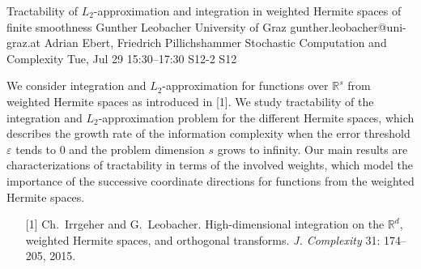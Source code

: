 \begin{talk}
  {Tractability of $L_2$-approximation and integration in weighted Hermite spaces of finite smoothness}%
  {Gunther Leobacher}%
  {University of Graz}%
  {gunther.leobacher@uni-graz.at}%
  {Adrian Ebert, Friedrich Pillichshammer}%
  {Stochastic Computation and Complexity}%
  {Tue, Jul 29 15:30–17:30}%
  {S12-2}%
  {S12}%
				
			

We consider integration and $L_2$-approximation for functions over $\mathbb R^s$ from weighted Hermite spaces as introduced in [1]. We study tractability of the integration and $L_2$-approximation problem for the different Hermite spaces, which describes the growth rate of the information complexity when the error threshold $\varepsilon$ tends to 0 and the problem dimension $s$ grows to infinity. Our main results are characterizations of tractability in terms of the involved weights, which  model the importance of the successive coordinate directions for functions from the weighted Hermite spaces.

\medskip

\begin{enumerate}
	\item[{[1]}] Ch.~Irrgeher and G.~Leobacher. High-dimensional integration on the $\mathbb R^d$, weighted Hermite spaces, and orthogonal transforms. \textit{J. Complexity} 31: 174--205, 2015. 
\end{enumerate}


\end{talk}


